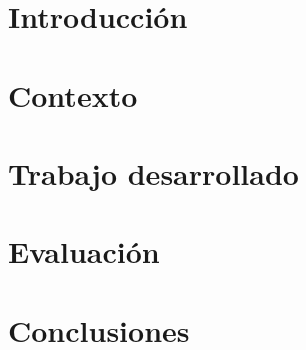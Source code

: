 \documentclass[12pt, a4paper, titlepage, twoside, openright]{report}
\begin{document}
	
	\cleardoublepage
	
	
	\cleardoublepage
	
	
	\cleardoublepage
	
	
	\cleardoublepage
	
	
	\cleardoublepage
	
	
	\cleardoublepage
	
	
	\cleardoublepage
	
	\tableofcontents
	\cleardoublepage
	
	\pagestyle{fancy}
	\renewcommand{\chaptermark}[1]{\markboth{
			\MakeUppercase{\chaptername}\ \thechapter.\ \\ {\scriptsize #1}}{}}
	\renewcommand{\sectionmark}[1]{\markright{
			{\thesection\  #1}}{}}
	\chapter{Introducción}
	\label{introduction}
	\cleardoublepage
	
	\chapter{Contexto}
	\label{background}
	
	\cleardoublepage

	\chapter{Trabajo desarrollado}
	\label{mainwork}
	\cleardoublepage
	
	\chapter{Evaluación}
	\label{evaluation}
	\cleardoublepage
	
	\chapter{Conclusiones}
	\label{conclusions}
	\cleardoublepage
	
	\listoftables
	\cleardoublepage
	
	\listoffigures
	\cleardoublepage
	
	\appendix
	\label{appendices}
	
	
	
\end{document}
